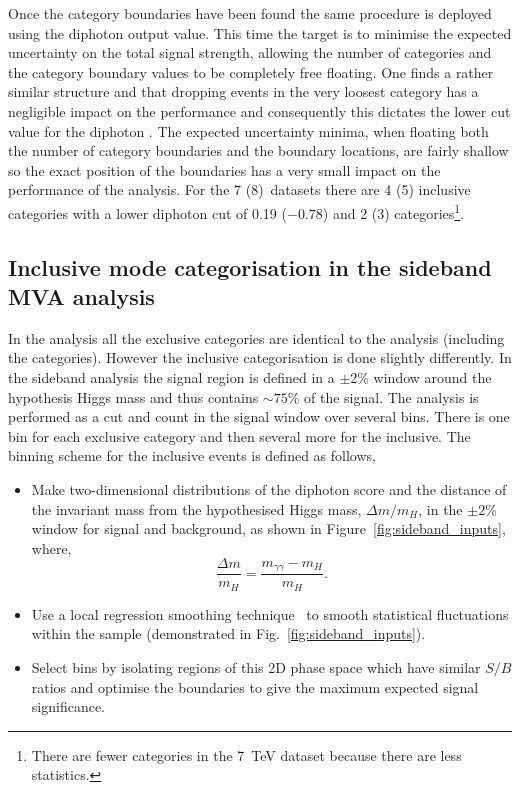 Once the \VBF category boundaries have been found the same procedure is deployed using the diphoton \BDT output value. This time the target is to minimise the expected uncertainty on the total signal strength, allowing the number of categories and the category boundary values to be completely free floating. One finds a rather similar structure and that dropping events in the very loosest category has a negligible impact on the performance and consequently this dictates the lower cut value for the diphoton \BDT. The expected uncertainty minima, when floating both the number of category boundaries and the boundary locations, are fairly shallow so the exact position of the boundaries has a very small impact on the performance of the analysis. For the 7 (8)~\TeV datasets there are 4 (5) inclusive categories with a lower diphoton \BDT cut of 0.19 ($-0.78$) and 2 (3) \VBF categories\footnote{There are fewer categories in the 7~TeV dataset because there are less statistics.}.

\subsection{Inclusive mode categorisation in the sideband \acs{MVA} analysis}
\label{sec:inclusive_cats_sideband}

In the \SMVA analysis all the exclusive categories are identical to the \MFM analysis (including the \VBF categories). However the inclusive categorisation is done slightly differently. In the sideband analysis the signal region is defined in a $\pm2$\% window around the hypothesis Higgs mass and thus contains $\sim75\%$ of the signal. The analysis is performed as a cut and count in the signal window over several bins. There is one bin for each exclusive category and then several more for the inclusive. The binning scheme for the inclusive events is defined as follows,

\begin{itemize}
  \item Make two-dimensional distributions of the diphoton \BDT score and the distance of the invariant mass from the hypothesised Higgs mass, $\Delta m/m_{H}$, in the $\pm2$\% window for signal and background, as shown in Figure~\ref{fig:sideband_inputs}, where,
    \begin{equation}
      \frac{\Delta m}{m_{H}} = \frac{m_{\gamma\gamma} - m_{H}}{m_{H}}.
    \end{equation}
  \item Use a local regression smoothing technique~\cite{regression_smoothing} to smooth statistical fluctuations within the sample (demonstrated in Fig.~\ref{fig:sideband_inputs}).
  \item Select bins by isolating regions of this 2D phase space which have similar $S/B$ ratios and optimise the boundaries to give the maximum expected signal significance.   
\end{itemize}

